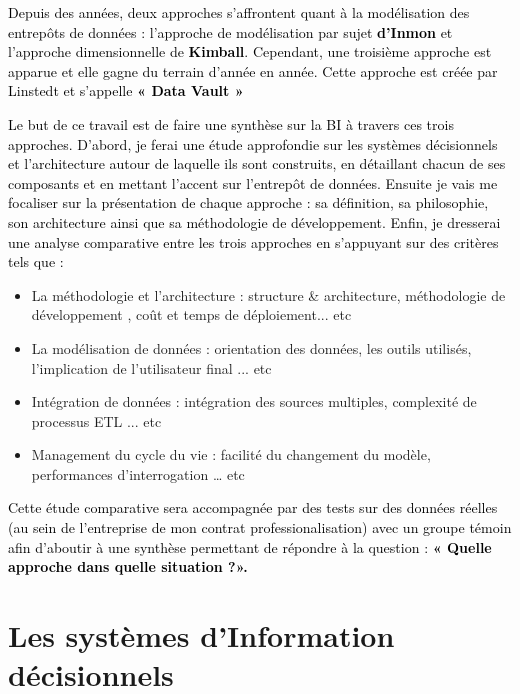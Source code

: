 \documentclass[a4paper,12pt]{report}
\begin{document}
\textcolor{black}{ Depuis des années, deux approches s’affrontent quant à la modélisation des entrepôts de
données : l’approche de modélisation par sujet  \textbf{d’Inmon }et l’approche dimensionnelle de  \textbf{ Kimball}.
Cependant, une troisième approche est apparue et elle gagne du terrain d’année en année. Cette
approche est créée par Linstedt et s’appelle \textbf{ « Data Vault »}}

\textcolor{black}{Le but de ce travail est de faire une synthèse sur la BI à travers ces trois approches. D’abord, je ferai une étude approfondie sur les systèmes décisionnels et l’architecture autour de laquelle ils sont construits, en détaillant chacun de ses composants et en mettant l’accent sur l’entrepôt de données. Ensuite je vais me focaliser sur la présentation de chaque approche : sa définition, sa philosophie, son architecture ainsi que sa méthodologie de développement. Enfin, je dresserai une analyse comparative entre les trois approches en s’appuyant sur des critères tels que :}

\begin{itemize}
	\item La méthodologie et l'architecture : structure \& architecture, méthodologie de développement , coût et temps de déploiement... etc
	\item La modélisation de données : orientation des données, les outils utilisés, l'implication de l'utilisateur final ... etc 
	\item Intégration de données : intégration des sources multiples, complexité de processus ETL ... etc
	\item Management du cycle du vie : facilité du changement du modèle, performances d'interrogation … etc
	
	
\end{itemize}



\textcolor{black}{ Cette étude comparative sera accompagnée par des tests sur des données réelles (au sein de l'entreprise de mon contrat professionalisation) avec un groupe témoin afin d’aboutir à une synthèse permettant de répondre à la question :  \textbf{ « Quelle approche dans quelle situation ?».}}
\\

\chapter{Les systèmes d’Information décisionnels}
\end{document}
